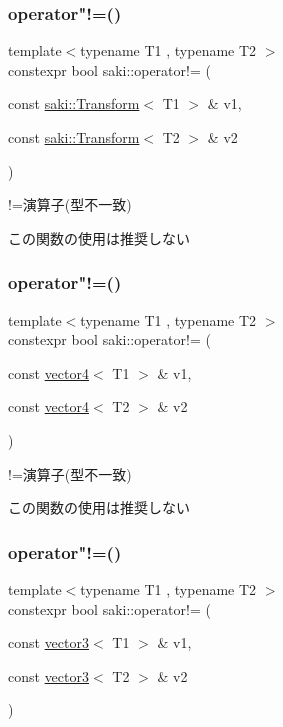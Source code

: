 \subsubsection{\texorpdfstring{operator"!=()}{operator!=()}\hspace{0.1cm}{\footnotesize\ttfamily [6/11]}}
{\footnotesize\ttfamily template$<$typename T1 , typename T2 $>$ \\
constexpr bool saki\+::operator!= (\begin{DoxyParamCaption}\item[{const \mbox{\hyperlink{classsaki_1_1_transform}{saki\+::\+Transform}}$<$ T1 $>$ \&}]{v1,  }\item[{const \mbox{\hyperlink{classsaki_1_1_transform}{saki\+::\+Transform}}$<$ T2 $>$ \&}]{v2 }\end{DoxyParamCaption})}



!=演算子(型不一致) 

この関数の使用は推奨しない \mbox{\label{namespacesaki_abf6f98117a7a12898df59d2041040000}} 
\subsubsection{\texorpdfstring{operator"!=()}{operator!=()}\hspace{0.1cm}{\footnotesize\ttfamily [7/11]}}
{\footnotesize\ttfamily template$<$typename T1 , typename T2 $>$ \\
constexpr bool saki\+::operator!= (\begin{DoxyParamCaption}\item[{const \mbox{\hyperlink{classsaki_1_1vector4}{vector4}}$<$ T1 $>$ \&}]{v1,  }\item[{const \mbox{\hyperlink{classsaki_1_1vector4}{vector4}}$<$ T2 $>$ \&}]{v2 }\end{DoxyParamCaption})}



!=演算子(型不一致) 

この関数の使用は推奨しない \mbox{\label{namespacesaki_ae8393ad670f8bb199a92d4287bb1bf3a}} 
\subsubsection{\texorpdfstring{operator"!=()}{operator!=()}\hspace{0.1cm}{\footnotesize\ttfamily [8/11]}}
{\footnotesize\ttfamily template$<$typename T1 , typename T2 $>$ \\
constexpr bool saki\+::operator!= (\begin{DoxyParamCaption}\item[{const \mbox{\hyperlink{classsaki_1_1vector3}{vector3}}$<$ T1 $>$ \&}]{v1,  }\item[{const \mbox{\hyperlink{classsaki_1_1vector3}{vector3}}$<$ T2 $>$ \&}]{v2 }\end{DoxyParamCaption})}



